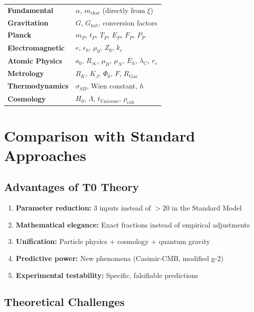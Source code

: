 \documentclass[12pt,a4paper]{report}
\begin{document}
	\begin{center}
		\begin{tabular}{ll}
			\textbf{Fundamental} & $\alpha$, $m_{\text{char}}$ (directly from $\xi$) \\
			\textbf{Gravitation} & $G$, $G_{\text{nat}}$, conversion factors \\
			\textbf{Planck} & $m_P$, $t_P$, $T_P$, $E_P$, $F_P$, $P_P$ \\
			\textbf{Electromagnetic} & $e$, $\epsilon_0$, $\mu_0$, $Z_0$, $k_e$ \\
			\textbf{Atomic Physics} & $a_0$, $R_\infty$, $\mu_B$, $\mu_N$, $E_h$, $\lambda_C$, $r_e$ \\
			\textbf{Metrology} & $R_K$, $K_J$, $\Phi_0$, $F$, $R_{\text{Gas}}$ \\
			\textbf{Thermodynamics} & $\sigma_{SB}$, Wien constant, $h$ \\
			\textbf{Cosmology} & $H_0$, $\Lambda$, $t_{\text{Universe}}$, $\rho_{\text{crit}}$ \\
		\end{tabular}
	\end{center}
	
	\section{Comparison with Standard Approaches}
	
	\subsection{Advantages of T0 Theory}
	
	\begin{enumerate}
		\item \textbf{Parameter reduction:} 3 inputs instead of $>20$ in the Standard Model
		\item \textbf{Mathematical elegance:} Exact fractions instead of empirical adjustments
		\item \textbf{Unification:} Particle physics + cosmology + quantum gravity
		\item \textbf{Predictive power:} New phenomena (Casimir-CMB, modified g-2)
		\item \textbf{Experimental testability:} Specific, falsifiable predictions
	\end{enumerate}
	
	\subsection{Theoretical Challenges}
	
\end{document}
